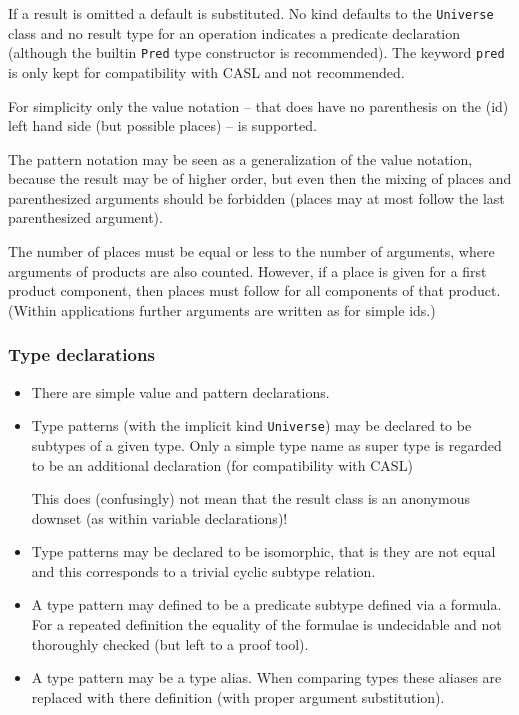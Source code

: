 \documentclass{article}
\begin{document}
If a result is omitted a default is substituted. No kind defaults to the
\texttt{Universe} class and no result type for an operation indicates a
predicate declaration (although the builtin \texttt{Pred} type constructor is
recommended). The keyword \texttt{pred} is only kept for compatibility with
CASL and not recommended.

For simplicity only the value notation -- that does have no parenthesis on the
(id) left hand side (but possible places) -- is supported. 

The pattern notation may be seen as a generalization of the value notation,
because the result may be of higher order, but even then the mixing of places
and parenthesized arguments should be forbidden (places may at most follow the
last parenthesized argument).

The number of places must be equal or less to the number of arguments, where
arguments of products are also counted. However, if a place is given for a
first product component, then places must follow for all components of that
product. (Within applications further arguments are written as for
simple ids.)

\subsubsection*{Type declarations}

\begin{itemize}
\item There are simple value and pattern declarations. 
\item Type patterns (with the implicit kind \texttt{Universe})
  may be declared to be subtypes of a given type. Only a simple type name as
  super type is regarded to be an additional declaration (for compatibility
  with CASL)
  
  This does (confusingly) not mean that the result class is an anonymous
  downset (as within variable declarations)!
\item Type patterns may be declared to be isomorphic, that is
  they are not equal and this corresponds to a trivial cyclic subtype
  relation.
\item A type pattern may defined to be a predicate subtype defined via a
  formula. For a repeated definition the equality of the formulae is
  undecidable and not thoroughly checked (but left to a proof tool).  
\item A type pattern may be a type alias. When comparing types these aliases
  are replaced with there definition (with proper argument substitution). 
\end{itemize}
\end{document}
